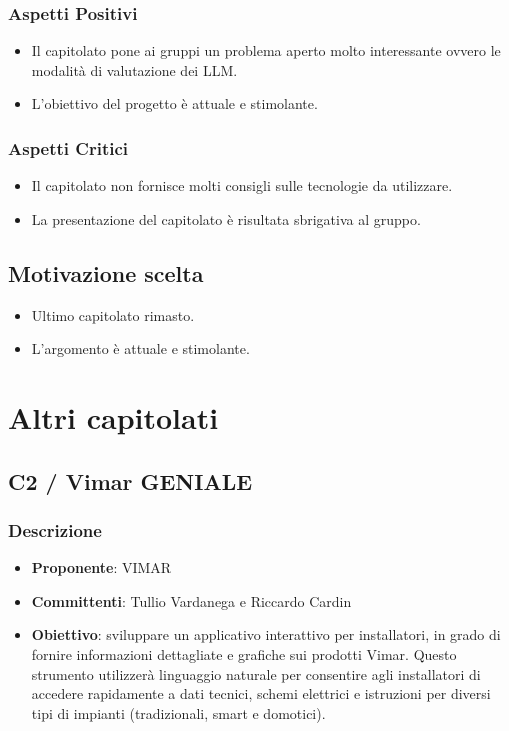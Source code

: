 \documentclass[a4paper, 12pt]{article}
\begin{document}
\subsubsection{Aspetti Positivi}
\begin{itemize}
    \item Il capitolato pone ai gruppi un problema aperto molto interessante ovvero le modalità di valutazione dei LLM.
    \item L'obiettivo del progetto è attuale e stimolante.
\end{itemize}

\subsubsection{Aspetti Critici}
\begin{itemize}
    \item Il capitolato non fornisce molti consigli sulle tecnologie da utilizzare.
    \item La presentazione del capitolato è risultata sbrigativa al gruppo.
\end{itemize}

\subsection{Motivazione scelta}
\begin{itemize}
    \item Ultimo capitolato rimasto.
    \item L'argomento è attuale e stimolante.
\end{itemize}

\section{Altri capitolati}
\subsection{C2 / Vimar GENIALE}

\subsubsection{Descrizione}
\begin{itemize}
    \item \textbf{Proponente}: VIMAR
    \item \textbf{Committenti}: Tullio Vardanega e Riccardo Cardin
    \item \textbf{Obiettivo}: sviluppare un applicativo interattivo per installatori, in grado di fornire informazioni dettagliate e grafiche sui prodotti Vimar. 
    Questo strumento utilizzerà linguaggio naturale per consentire agli installatori di accedere rapidamente a dati tecnici, schemi elettrici e istruzioni per diversi tipi di impianti (tradizionali, smart e domotici).    
\end{itemize}
\end{document}
